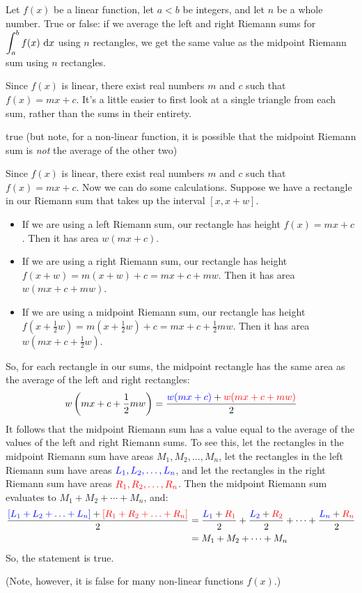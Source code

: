 \begin{question}
Let $f(x)$ be a linear function,  let $a<b$ be integers, and let $n$ be a whole number. True or false: if we average the left and right Riemann sums for $\displaystyle\int_a^b f(x)\ \dee{x}$ using $n$ rectangles, we get the same value as the midpoint Riemann sum using $n$ rectangles.
\end{question}
\begin{hint}
Since $f(x)$ is linear, there exist real numbers $m$ and $c$ such that $f(x)=mx+c$. It's a little easier to first look at a single triangle from each sum, rather than the sums in their entirety.
\end{hint}
\begin{answer}
true (but note, for a non-linear function, it is possible that the midpoint Riemann sum is \emph{not} the average of the other two)
\end{answer}
\begin{solution}
Since $f(x)$ is linear, there exist real numbers $m$ and $c$ such that $f(x)=mx+c$. Now we can do some calculations. Suppose we have a rectangle in our Riemann sum that takes up the interval $[x,x+w]$.
\begin{itemize}
\color{blue} \item If we are using a left Riemann sum, our rectangle has height $f(x)=mx+c$.
Then it has area $w(mx+c)$. \color{red}
\item If we are using a right Riemann sum, our rectangle has height $f(x+w)=m(x+w)+c=mx+c+mw$. Then it has area $w(mx+c+mw)$.\color{black}
\item If we are using a midpoint Riemann sum, our rectangle has height $f(x+\frac{1}{2}w)=m(x+\frac{1}{2}w)+c=mx+c+\frac{1}{2}mw$.   Then it has area $w\left(mx+c+\frac{1}{2}w\right)$.
\end{itemize}
So, for each rectangle in our sums, the midpoint rectangle  has the same area as the average of the left and right rectangles:
\[w\left(mx+c+\frac{1}{2}mw\right) = \dfrac{\textcolor{blue}{w(mx+c)}+\textcolor{red}{w(mx+c+mw)}}{2}\]
It follows that the midpoint Riemann sum has a value equal to the average of the values of the left and right Riemann sums. To see this, let the rectangles in the midpoint Riemann sum have areas $M_1,M_2,\ldots,M_n$,
let the rectangles in the left Riemann sum have areas $\textcolor{blue}{L_1,L_2,\ldots,L_n}$, and
let the rectangles in the right Riemann sum have areas $\textcolor{red}{R_1,R_2,\ldots,R_n}$. Then the midpoint Riemann sum evaluates to $M_1+M_2+\cdots+M_n$, and:
\begin{align*}\dfrac{\textcolor{blue}{[L_1+L_2+\ldots+L_n]}+
\textcolor{red}{[R_1+R_2+\ldots+R_n]}
}{2} &=
\dfrac{\textcolor{blue}{L_1}+
\textcolor{red}{R_1}
}{2}+
\dfrac{\textcolor{blue}{L_2}+
\textcolor{red}{R_2}
}{2}+
\cdots
+
\dfrac{\textcolor{blue}{L_n}+
\textcolor{red}{R_n}
}{2} \\
&=M_1+M_2+\cdots+M_n\end{align*}
So, the statement is true.

(Note, however, it is false for many non-linear functions $f(x)$.)
\end{solution}
